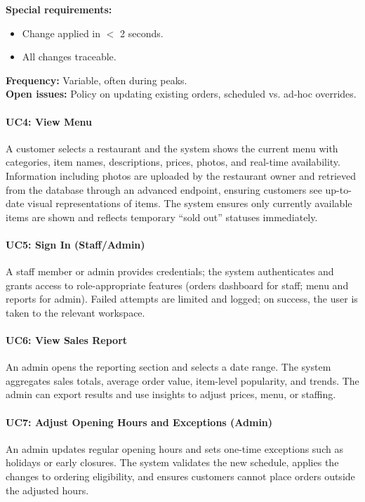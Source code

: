 \documentclass{article}
\begin{document}
\textbf{Special requirements:}
\begin{itemize}
    \item Change applied in $<$ 2 seconds.
    \item All changes traceable.
\end{itemize}

\textbf{Frequency:} Variable, often during peaks.\\
\textbf{Open issues:} Policy on updating existing orders, scheduled vs. ad-hoc overrides.




\paragraph{UC4: View Menu}  
A customer selects a restaurant and the system shows the current menu with categories, item names, descriptions, prices, photos, and real-time availability. Information including photos are uploaded by the restaurant owner and retrieved from the database through an advanced endpoint, ensuring customers see up-to-date visual representations of items. The system ensures only currently available items are shown and reflects temporary “sold out” statuses immediately.

\paragraph{UC5: Sign In (Staff/Admin)}  
A staff member or admin provides credentials; the system authenticates and grants access to role-appropriate features (orders dashboard for staff; menu and reports for admin). Failed attempts are limited and logged; on success, the user is taken to the relevant workspace.

\paragraph{UC6: View Sales Report}  
An admin opens the reporting section and selects a date range. The system aggregates sales totals, average order value, item-level popularity, and trends. The admin can export results and use insights to adjust prices, menu, or staffing.

\paragraph{UC7: Adjust Opening Hours and Exceptions (Admin)}  
An admin updates regular opening hours and sets one-time exceptions such as holidays or early closures. The system validates the new schedule, applies the changes to ordering eligibility, and ensures customers cannot place orders outside the adjusted hours.
\end{document}
